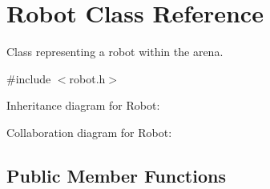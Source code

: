 \hypertarget{classRobot}{}\section{Robot Class Reference}
\label{classRobot}


Class representing a robot within the arena.  




{\ttfamily \#include $<$robot.\+h$>$}



Inheritance diagram for Robot\+:


Collaboration diagram for Robot\+:
\subsection*{Public Member Functions}
